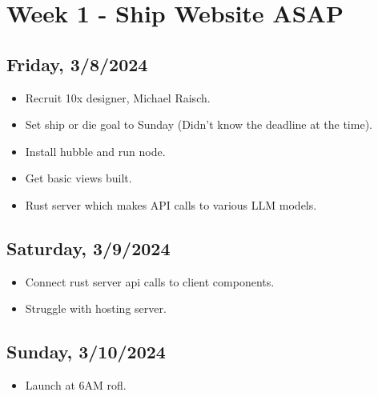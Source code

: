 \newpage
\section{Week 1 - Ship Website ASAP}

\subsection*{Friday, 3/8/2024}
\begin{itemize}
    \item Recruit 10x designer, Michael Raisch.
    \item Set ship or die goal to Sunday (Didn't know the deadline at the time).
    \item Install hubble and run node.
    \item Get basic views built.
    \item Rust server which makes API calls to various LLM models.
\end{itemize}

\subsection*{Saturday, 3/9/2024}
\begin{itemize}
    \item Connect rust server api calls to client components. 
    \item Struggle with hosting server.
\end{itemize}

\subsection*{Sunday, 3/10/2024}
\begin{itemize}
    \item Launch at 6AM rofl.
\end{itemize}
